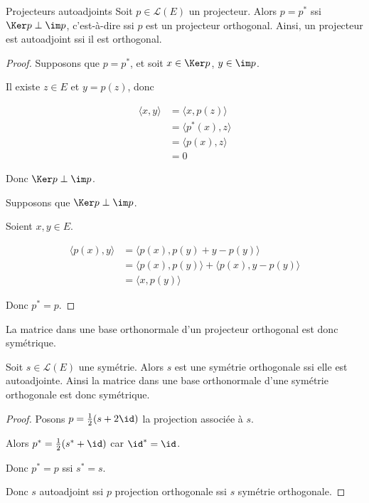 \begin{proposition}{Projecteurs autoadjoints}{}
    Soit $p \in \mathscr L(E)$ un projecteur. Alors $p = p^*$ ssi 
    $\Ker p \perp \im p$, c'est-à-dire ssi $p$ est un projecteur orthogonal. 
    Ainsi, un projecteur est autoadjoint ssi il est orthogonal.
\end{proposition}

\begin{proof}
    Supposons que $p = p^*$, et soit $x \in \Ker p$, $y \in \im p$.

    Il existe $z \in E$ et $y = p(z)$, donc 

    \begin{align}
        \langle x, y \rangle & = \langle x, p(z) \rangle \\
        & = \langle p^*(x), z \rangle \\
        & = \langle p(x), z \rangle \\
        & = 0
    \end{align}

    Donc $\Ker p \perp \im p$. 

    Supposons que $\Ker p \perp \im p$. 

    Soient $x, y \in E$. 

    \begin{align}
        \langle p(x), y \rangle & = \langle p(x), p(y) + y - p(y) \rangle \\
        & = \langle p(x), p(y) \rangle + \langle p(x), y - p(y) \rangle \\
        & = \langle x, p(y) \rangle 
    \end{align}

    Donc $p^* = p$.
\end{proof}

\begin{corollaire}{}{}
    La matrice dans une base orthonormale d'un projecteur orthogonal est donc symétrique.
\end{corollaire}

\begin{corollaire}{}{}
    Soit $s \in \mathscr L(E)$ une symétrie. Alors 
    $s$ est une symétrie orthogonale ssi elle est autoadjointe.
    Ainsi la matrice dans une base orthonormale d'une symétrie orthogonale est donc symétrique.
\end{corollaire}

\begin{proof}
    Posons $p = \frac 1 2 (s + 2 \id)$ la projection associée à $s$. 

    Alors $p^* = \frac 1 2(s^* + \id)$ car $\id^* = \id$. 

    Donc $p^* = p$ ssi $s^* = s$.

    Donc $s$ autoadjoint ssi $p$ projection orthogonale ssi $s$ symétrie orthogonale. 
\end{proof}

